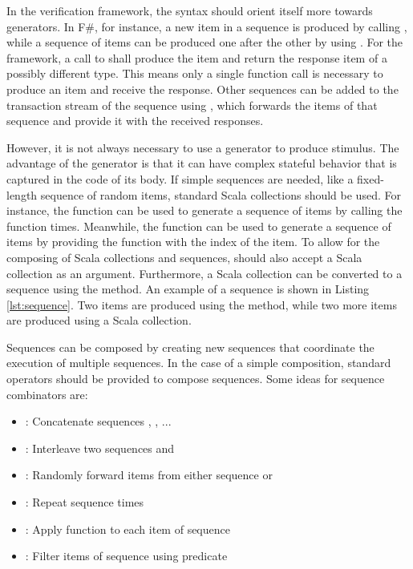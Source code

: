 In the verification framework, the syntax should orient itself more towards generators. In F\#, for instance, a new
item in a sequence is produced by calling , while a sequence of items can be produced one after the
other by using . For the framework, a call to  shall produce the item and return
the response item of a possibly different type. This means only a single function call is necessary to produce an
item and receive the response.
Other sequences can be added to the transaction stream of the sequence using , which forwards the items of that
sequence and provide it with the received responses.

However, it is not always necessary to use a generator to produce stimulus. The advantage of the generator is that it can have
complex stateful behavior that is captured in the code of its body. If simple sequences are needed, like a
fixed-length sequence of random items, standard Scala collections should be used. For instance, the
 function can be used to generate a sequence of  items by calling the  function
 times. Meanwhile, the  function can be used to generate a sequence of  items by
providing the function  with the index of the item. To allow for the composing of Scala collections
and sequences,  should also accept a Scala collection as an argument. Furthermore, a Scala collection
can be converted to a sequence using the  method. An example of a sequence is shown in Listing
\ref{lst:sequence}. Two items are produced using the  method, while two more items are produced using a
Scala  collection.

Sequences can be composed by creating new sequences that coordinate the execution of multiple sequences. In the
case of a simple composition, standard operators should be provided to compose sequences. Some ideas for sequence
combinators are:

\begin{itemize}
  \item {}: Concatenate sequences , , ...
  \item {}: Interleave two sequences  and 
  \item {}: Randomly forward items from either sequence  or 
  \item {}: Repeat sequence   times
  \item {}: Apply function  to each item of sequence 
  \item {}: Filter items of sequence  using predicate 
\end{itemize}

